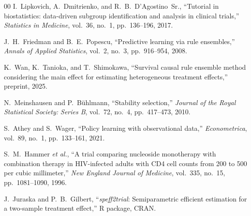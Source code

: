 \documentclass[conference]{IEEEtran}
\begin{document}
\begin{thebibliography}{00}
 I.~Lipkovich, A.~Dmitrienko, and R.~B.~D'Agostino~Sr.,
``Tutorial in biostatistics: data-driven subgroup identification and analysis
in clinical trials,'' \emph{Statistics in Medicine}, vol.~36, no.~1,
pp.~136--196, 2017.

 J.~H.~Friedman and B.~E.~Popescu, ``Predictive learning via
rule ensembles,'' \emph{Annals of Applied Statistics}, vol.~2, no.~3,
pp.~916--954, 2008.

 K.~Wan, K.~Tanioka, and T.~Shimokawa, ``Survival causal rule
ensemble method considering the main effect for estimating heterogeneous
treatment effects,'' preprint, 2025.

 N.~Meinshausen and P.~B\"uhlmann, ``Stability selection,''
\emph{Journal of the Royal Statistical Society: Series B}, vol.~72, no.~4,
pp.~417--473, 2010.

 S.~Athey and S.~Wager, ``Policy learning with observational
data,'' \emph{Econometrica}, vol.~89, no.~1, pp.~133--161, 2021.

 S.~M.~Hammer \emph{et al.}, ``A trial comparing nucleoside
monotherapy with combination therapy in HIV-infected adults with CD4 cell
counts from 200 to 500 per cubic millimeter,'' \emph{New England Journal of
Medicine}, vol.~335, no.~15, pp.~1081--1090, 1996.

 J.~Juraska and P.~B.~Gilbert, ``\emph{speff2trial}:
Semiparametric efficient estimation for a two-sample treatment effect,'' R
package, CRAN.

\end{thebibliography}
\end{document}
